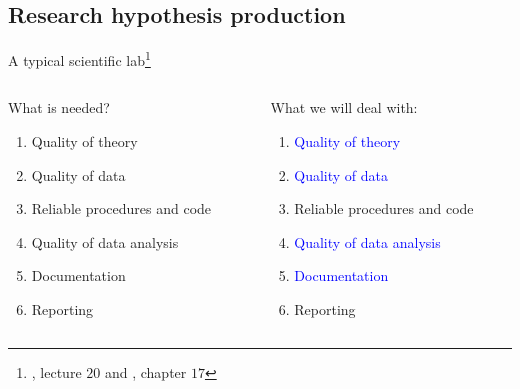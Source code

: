 \subsection{Research hypothesis production}
%
%
\begin{frame}[t, negative]
	\subsectionpage
\end{frame}
%
%
\begin{frame}
	{A typical scientific lab\footnote{\citet{McElreath_2020}, lecture $20$ and \citet{McElreath_2022}, chapter $17$}}
	\begin{columns}
		\begin{column}{0.5\textwidth}
			What is needed?
		
			\begin{enumerate}
				\item Quality of theory
				\item Quality of data
				\item Reliable procedures and code
				\item Quality of data analysis
				\item Documentation
				\item Reporting
			\end{enumerate} 
		\end{column}
		\begin{column}{0.5\textwidth}  
			What we will deal with:
			\begin{enumerate}
				\item \textcolor{blue}{Quality of theory}
				\item \textcolor{blue}{Quality of data}
				\item \alert{Reliable procedures and code}
				\item \textcolor{blue}{Quality of data analysis}
				\item \textcolor{blue}{Documentation}
				\item Reporting
			\end{enumerate} 
		\end{column}
	\end{columns}
\end{frame}
%
%
